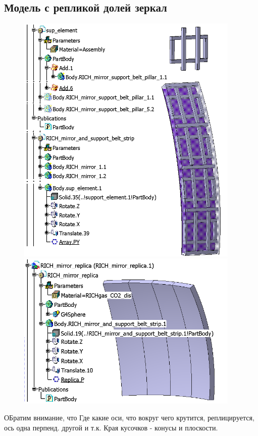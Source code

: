 \subsection{Модель с репликой долей зеркал}\label{sec:secModelWithReplMirrors}

\begin{figure}[H]
\begin{minipage}[t]{0.495\textwidth}
\includegraphics[width=0.95\textwidth]{pictures/CbmRichMirror1.png}
\end{minipage}
\hspace{0.01\textwidth}
\begin{minipage}[t]{0.495\textwidth}
\includegraphics[width=0.95\textwidth]{pictures/CbmRichMirror2.png}
\end{minipage}
\caption{}
\label{fig:ReplicaMirror}
\end{figure}

ОБратим внимание, что
Где какие оси, что вокруг чего крутится, реплицируется, ось одна перпенд. другой и т.к.
Края кусочков - конусы и плоскости.




